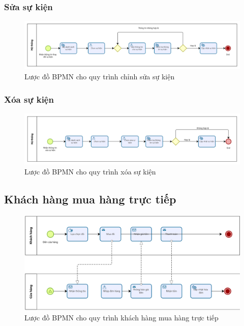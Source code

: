 \subsubsection{Sửa sự kiện}

\begin{figure}[!htp]
    \centering
    \includegraphics[width=14cm]{img/BPMN/event/edit_event.png}
    \newline
    \caption{Lược đồ BPMN cho quy trình chỉnh sửa sự kiện}
\end{figure}

\subsubsection{Xóa sự kiện}

\begin{figure}[!htp]
    \centering
    \includegraphics[width=14cm]{img/BPMN/event/delete_event.png}
    \newline
    \caption{Lược đồ BPMN cho quy trình xóa sự kiện}
\end{figure}

\subsection{Khách hàng mua hàng trực tiếp}
\begin{figure}[!htp]
    \centering
    \includegraphics[width=14cm]{img/BPMN/Hien/Customer_buyOffline.png}
    \newline
    \caption{Lược đồ BPMN cho quy trình khách hàng mua hàng trực tiếp}
\end{figure}

